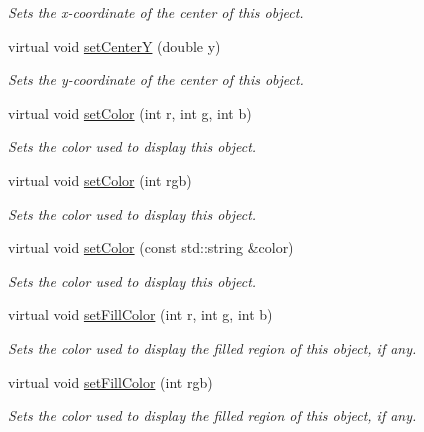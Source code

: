 \begin{DoxyCompactItemize}
\begin{DoxyCompactList}\small\item\em Sets the x-\/coordinate of the center of this object. \end{DoxyCompactList}\item 
virtual void \mbox{\hyperlink{classGObject_aad2a22b4fde88c33306b92aebf641d57}{set\+CenterY}} (double y)
\begin{DoxyCompactList}\small\item\em Sets the y-\/coordinate of the center of this object. \end{DoxyCompactList}\item 
virtual void \mbox{\hyperlink{classGObject_ad57ef49bc31db94e92648aa3737923d6}{set\+Color}} (int r, int g, int b)
\begin{DoxyCompactList}\small\item\em Sets the color used to display this object. \end{DoxyCompactList}\item 
virtual void \mbox{\hyperlink{classGObject_ab1f5cc0f5cc6bbbd716a526c61f1081d}{set\+Color}} (int rgb)
\begin{DoxyCompactList}\small\item\em Sets the color used to display this object. \end{DoxyCompactList}\item 
virtual void \mbox{\hyperlink{classGObject_a61374df6c11b52cfbb0815decdbaebc6}{set\+Color}} (const std\+::string \&color)
\begin{DoxyCompactList}\small\item\em Sets the color used to display this object. \end{DoxyCompactList}\item 
virtual void \mbox{\hyperlink{classGObject_ad767a33971159e9493e221cca4c00ae9}{set\+Fill\+Color}} (int r, int g, int b)
\begin{DoxyCompactList}\small\item\em Sets the color used to display the filled region of this object, if any. \end{DoxyCompactList}\item 
virtual void \mbox{\hyperlink{classGObject_aa59d9775a67fa7df2b24a95cd34840a3}{set\+Fill\+Color}} (int rgb)
\begin{DoxyCompactList}\small\item\em Sets the color used to display the filled region of this object, if any. \end{DoxyCompactList}\item 

\end{DoxyCompactItemize}
